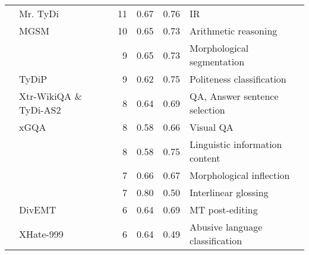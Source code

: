 \begin{tabular}{llrlll}
	\citet{zhang-etal-2021-mr}                    & Mr. TyDi               & 11                              & 0.67                            & 0.76                            & IR                                  \\
	\citet{shi2023language}                       & MGSM                   & 10                              & 0.65                            & 0.73                            & Arithmetic reasoning                \\
	\citet{mott-etal-2020-morphological}          &                        & 9                               & 0.65                            & 0.73                            & Morphological segmentation          \\
	\citet{srinivasan-choi-2022-tydip}            & TyDiP                  & 9                               & 0.62                            & 0.75                            & Politeness classification           \\
	\citet{gupta-etal-2023-cross}                 & Xtr-WikiQA \& TyDi-AS2 & 8                               & 0.64                            & 0.69                            & QA, Answer sentence selection       \\
	\citet{pfeiffer-etal-2022-xgqa}               & xGQA                   & 8                               & \cellcolor{low-color!40}  0.58  & 0.66                            & Visual QA                           \\
	\citet{sproat-etal-2014-database}             &                        & 8                               & 0.58                            & 0.75                            & Linguistic information content      \\
	\citet{samir-silfverberg-2023-understanding}  &                        & 7                               & 0.66                            & 0.67                            & Morphological inflection            \\
	\citet{ginn-etal-2023-findings}               &                        & 7                               & 0.80\lowcov                     & 0.50                            & Interlinear glossing                \\
	\citet{sarti-etal-2022-divemt}                & DivEMT                 & 6                               & 0.64                            & 0.69                            & MT post-editing                     \\
	\citet{glavas-etal-2020-xhate}                & XHate-999              & 6                               & 0.64                            & 0.49                            & Abusive language classification     \\

\end{tabular}
